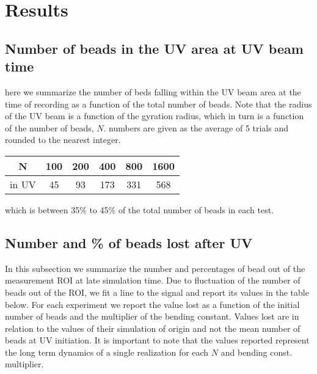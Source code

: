 \documentclass[12pt]{report}
\begin{document}
\section{Results}
\subsection{Number of beads in the UV area at UV beam time}
here we summarize the number of beds falling within the UV beam area at the time of recording as a function of the total number of beads. Note that the radius of the UV beam is a function of the gyration radius, which in turn is a function of the number of beads, $N$. 
numbers are given as the average of 5 trials and rounded to the nearest integer. 
\begin{table}[H]
\begin{tabular}{c|c c c c c}	
	\hline
	N     & 100 & 200 & 400 & 800 & 1600\\
	\hline
	in UV & 45  & 93  & 173 & 331 & 568\\
	\hline
\end{tabular}
\end{table}
which is between 35\% to 45\%  of the total number of beads in each test.

\subsection{Number and \% of beads lost after UV}
In this subsection we summarize the number and percentages of bead out of the measurement ROI at late simulation time. Due to fluctuation of the number of beads out of the ROI, we fit a line to the signal and report its values in the table below. For each experiment we report the value lost as a function of the initial number of beads and the multiplier of the bending constant. Values lost are in relation to the values of their simulation of origin and not the mean number of beads at UV initiation. It is important to note that the values reported represent the long term dynamics of a single realization for each $N$ and bending const. multiplier.
\end{document}
